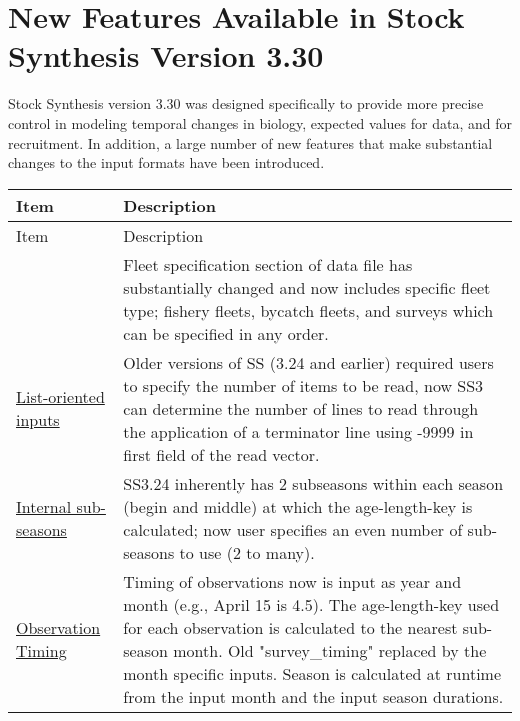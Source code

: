 \section{New Features Available in Stock Synthesis Version 3.30}

Stock Synthesis version 3.30 was designed specifically to provide more precise control in modeling temporal changes in biology, expected values for data, and for recruitment.  In addition, a large number of new features that make substantial changes to the input formats have been introduced.
		
\begin{center}
	{\renewcommand{\arraystretch}{1.5}%
	\begin{longtable}{p{1.75cm} p{9.5cm}}
		\hline
		Item &  Description\\
		\hline
		\endfirsthead
		\hline
		\toprule
		Item &  Description\\
		\hline
		\endhead

		\hline
		\endfoot

		\endlastfoot
		
		\multicolumn{1}{l}{\hyperlink{GenericFleets}{Generic Fleets}} & 
				Fleet specification section of data file has substantially changed and now includes specific fleet type; fishery fleets, bycatch fleets, and surveys which can be specified in any order.\\

		\multicolumn{1}{l}{\hyperlink{ListBased}{List-oriented inputs}} & 
			    Older versions of SS (3.24 and earlier) required users to specify the number of items to be read, now SS3 can determine the number of lines to read through the application of a terminator line using -9999 in first field of the read vector. \\
		  
		\multicolumn{1}{l}{\hyperlink{SubSeas}{Internal sub-seasons}} & 
			    SS3.24 inherently has 2 subseasons within each season (begin and middle) at which the age-length-key is calculated; now user specifies an even number of sub-seasons to use (2 to many). \\

		\multicolumn{1}{l}{\hyperlink{ObsTiming}{Observation Timing}} & 
			    Timing of observations now is input as year and month (e.g., April 15 is 4.5). The age-length-key used for each observation is calculated to the nearest sub-season month.  Old "survey\_timing" replaced by the month specific inputs.  Season is calculated at runtime from the input month and the input season durations. \\


\end{longtable}}
\end{center}

